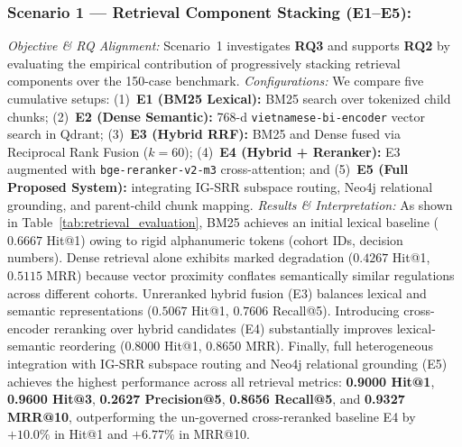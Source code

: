 \subsubsection{Scenario 1 --- Retrieval Component Stacking (E1--E5):}
\emph{Objective \& RQ Alignment:} Scenario~1 investigates \textbf{RQ3} and supports \textbf{RQ2} by evaluating the empirical contribution of progressively stacking retrieval components over the 150-case benchmark.
\emph{Configurations:} We compare five cumulative setups: (1)~\textbf{E1 (BM25 Lexical):} BM25 search over tokenized child chunks; (2)~\textbf{E2 (Dense Semantic):} 768-d \texttt{vietnamese-bi-encoder} vector search in Qdrant; (3)~\textbf{E3 (Hybrid RRF):} BM25 and Dense fused via Reciprocal Rank Fusion ($k=60$); (4)~\textbf{E4 (Hybrid + Reranker):} E3 augmented with \texttt{bge-reranker-v2-m3} cross-attention; and (5)~\textbf{E5 (Full Proposed System):} integrating IG-SRR subspace routing, Neo4j relational grounding, and parent-child chunk mapping.
\emph{Results \& Interpretation:} As shown in Table~\ref{tab:retrieval_evaluation}, BM25 achieves an initial lexical baseline ($0.6667$ Hit@1) owing to rigid alphanumeric tokens (cohort IDs, decision numbers). Dense retrieval alone exhibits marked degradation ($0.4267$ Hit@1, $0.5115$ MRR) because vector proximity conflates semantically similar regulations across different cohorts. Unreranked hybrid fusion (E3) balances lexical and semantic representations ($0.5067$ Hit@1, $0.7606$ Recall@5). Introducing cross-encoder reranking over hybrid candidates (E4) substantially improves lexical-semantic reordering ($0.8000$ Hit@1, $0.8650$ MRR). Finally, full heterogeneous integration with IG-SRR subspace routing and Neo4j relational grounding (E5) achieves the highest performance across all retrieval metrics: \textbf{0.9000 Hit@1}, \textbf{0.9600 Hit@3}, \textbf{0.2627 Precision@5}, \textbf{0.8656 Recall@5}, and \textbf{0.9327 MRR@10}, outperforming the un-governed cross-reranked baseline E4 by $+10.0\%$ in Hit@1 and $+6.77\%$ in MRR@10.

